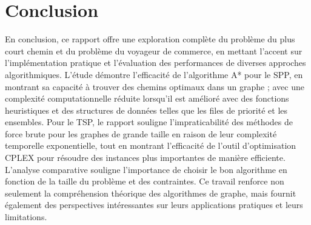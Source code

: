 \chapter{Conclusion}
\label{chap:conclusion}
En conclusion, ce rapport offre une exploration complète du problème du plus court chemin et du problème du voyageur de commerce, en mettant l'accent sur l'implémentation pratique et l'évaluation des performances de diverses approches algorithmiques. L'étude démontre l'efficacité de l'algorithme A* pour le SPP, en montrant sa capacité à trouver des chemins optimaux dans un graphe ; avec une complexité computationnelle réduite lorsqu'il est amélioré avec des fonctions heuristiques et des structures de données telles que les files de priorité et les ensembles. Pour le TSP, le rapport souligne l'impraticabilité des méthodes de force brute pour les graphes de grande taille en raison de leur complexité temporelle exponentielle, tout en montrant l'efficacité de l'outil d'optimisation CPLEX pour résoudre des instances plus importantes de manière efficiente. L'analyse comparative souligne l'importance de choisir le bon algorithme en fonction de la taille du problème et des contraintes. Ce travail renforce non seulement la compréhension théorique des algorithmes de graphe, mais fournit également des perspectives intéressantes sur leurs applications pratiques et leurs limitations.
